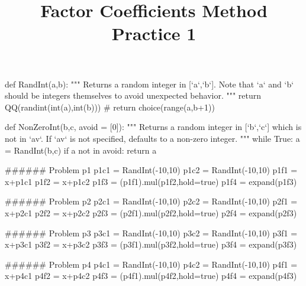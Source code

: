 \documentclass{ximera}
\title{Factor Coefficients Method Practice 1}
\begin{document}
\begin{sagesilent}
def RandInt(a,b):
    """ Returns a random integer in [`a`,`b`]. Note that `a` and `b` should be integers themselves to avoid unexpected behavior.
    """
    return QQ(randint(int(a),int(b)))
    # return choice(range(a,b+1))

def NonZeroInt(b,c, avoid = [0]):
    """ Returns a random integer in [`b`,`c`] which is not in `av`. 
        If `av` is not specified, defaults to a non-zero integer.
    """
    while True:
        a = RandInt(b,c)
        if a not in avoid:
            return a

###### Problem p1
p1c1 = RandInt(-10,10)
p1c2 = RandInt(-10,10)
p1f1 = x+p1c1
p1f2 = x+p1c2
p1f3 = (p1f1).mul(p1f2,hold=true)
p1f4 = expand(p1f3)

###### Problem p2
p2c1 = RandInt(-10,10)
p2c2 = RandInt(-10,10)
p2f1 = x+p2c1
p2f2 = x+p2c2
p2f3 = (p2f1).mul(p2f2,hold=true)
p2f4 = expand(p2f3)

###### Problem p3
p3c1 = RandInt(-10,10)
p3c2 = RandInt(-10,10)
p3f1 = x+p3c1
p3f2 = x+p3c2
p3f3 = (p3f1).mul(p3f2,hold=true)
p3f4 = expand(p3f3)

###### Problem p4
p4c1 = RandInt(-10,10)
p4c2 = RandInt(-10,10)
p4f1 = x+p4c1
p4f2 = x+p4c2
p4f3 = (p4f1).mul(p4f2,hold=true)
p4f4 = expand(p4f3)

\end{sagesilent}
\end{document}
